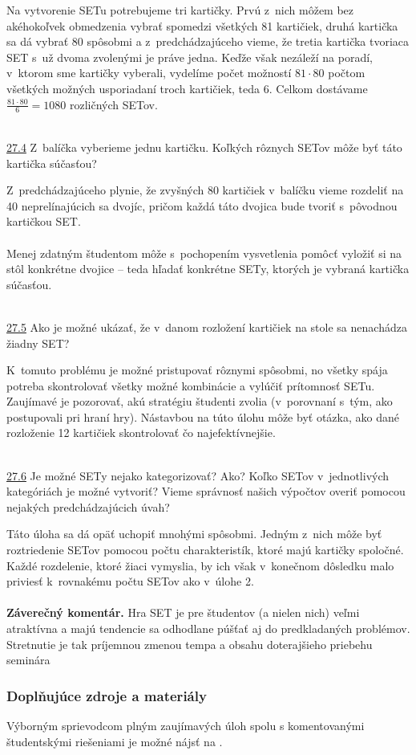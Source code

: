 {\rie  Na vytvorenie SETu potrebujeme tri kartičky. Prvú z~nich môžem bez akéhokoľvek obmedzenia vybrať spomedzi všetkých 81 kartičiek, druhá kartička sa dá vybrať 80 spôsobmi a z~predchádzajúceho vieme, že tretia kartička tvoriaca SET s~už dvoma zvolenými je práve jedna. Keďže však nezáleží na poradí, v~ktorom sme kartičky vyberali, vydelíme počet možností $81\cdot80$ počtom všetkých možných usporiadaní troch kartičiek, teda $6$. Celkom dostávame $\frac{81\cdot80}{6}=1080$ rozličných SETov.\\
\\
\begin{tcolorbox}[breakable,notitle,boxrule=0pt,colback=light-gray,colframe=light-gray]\ul{27.4} Z~balíčka vyberieme jednu kartičku. Koľkých rôznych SETov môže byť táto kartička súčasťou?\end{tcolorbox}
\rie  Z~predchádzajúceho plynie, že zvyšných 80 kartičiek v~balíčku vieme rozdeliť na 40 neprelínajúcich sa dvojíc, pričom každá táto dvojica bude tvoriť s~pôvodnou kartičkou SET.\\
\\
\kom Menej zdatným študentom môže s~pochopením vysvetlenia pomôcť vyložiť si na stôl konkrétne dvojice -- teda hľadať konkrétne SETy, ktorých je vybraná kartička súčasťou. \\
\\
\begin{tcolorbox}[breakable,notitle,boxrule=0pt,colback=light-gray,colframe=light-gray]\ul{27.5} Ako je možné ukázať, že v~danom rozložení kartičiek na stole sa nenachádza žiadny SET?\end{tcolorbox}
\rie  K~tomuto problému je možné pristupovať rôznymi spôsobmi, no všetky spája potreba skontrolovať všetky možné kombinácie a vylúčiť prítomnosť SETu. Zaujímavé je pozorovať, akú stratégiu študenti zvolia (v~porovnaní s~tým, ako postupovali pri hraní hry).  Nástavbou na túto úlohu môže byť otázka, ako dané rozloženie 12 kartičiek  skontrolovať čo najefektívnejšie.\\
\\

\begin{tcolorbox}[breakable,notitle,boxrule=0pt,colback=light-gray,colframe=light-gray]\ul{27.6} Je možné SETy nejako kategorizovať? Ako? Koľko SETov v~jednotlivých kategóriách je možné vytvoriť? Vieme správnosť našich výpočtov overiť pomocou nejakých predchádzajúcich úvah?\end{tcolorbox}
\rie Táto úloha sa dá opäť uchopiť mnohými spôsobmi. Jedným z~nich môže byť roztriedenie SETov pomocou počtu charakteristík, ktoré majú kartičky spoločné. Každé rozdelenie, ktoré žiaci vymyslia, by ich však v~konečnom dôsledku malo priviesť k~rovnakému počtu SETov ako v~úlohe 2.\\
\\
\textbf{Záverečný komentár.} Hra SET je pre študentov (a nielen nich) veľmi atraktívna a majú tendencie sa odhodlane púšťať aj do predkladaných problémov. Stretnutie je tak príjemnou zmenou tempa a obsahu doterajšieho priebehu seminára

\subsubsection*{Doplňujúce zdroje a materiály}

Výborným sprievodcom plným zaujímavých úloh spolu s komentovanými študentskými riešeniami je možné nájsť na .


}

